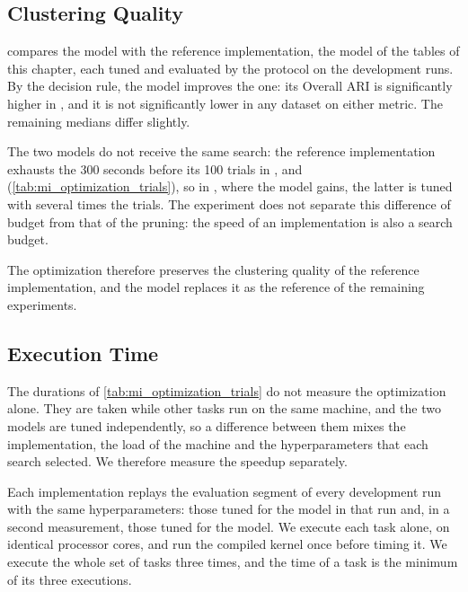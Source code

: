 \subsection{Clustering Quality}
\label{subsec:mi_optimization_quality}



 compares the  model with the reference implementation, the  model of the tables of this chapter, each tuned and evaluated by the protocol on the development runs. By the decision rule, the  model improves the  one: its Overall ARI is significantly higher in \ChameleonDSThree, and it is not significantly lower in any dataset on either metric. The remaining medians differ slightly.



The two models do not receive the same search: the reference implementation exhausts the 300 seconds before its 100 trials in \RandomRBFGeneratorEvents, \ChameleonDSThree and \ChameleonDSFour (\cref{tab:mi_optimization_trials}), so in \ChameleonDSThree, where the  model gains, the latter is tuned with several times the trials. The experiment does not separate this difference of budget from that of the pruning: the speed of an implementation is also a search budget.

The optimization therefore preserves the clustering quality of the reference implementation, and the  model replaces it as the reference of the remaining experiments.

\subsection{Execution Time}
\label{subsec:mi_optimization_time}

The durations of \cref{tab:mi_optimization_trials} do not measure the optimization alone. They are taken while other tasks run on the same machine, and the two models are tuned independently, so a difference between them mixes the implementation, the load of the machine and the hyperparameters that each search selected. We therefore measure the speedup separately.

Each implementation replays the evaluation segment of every development run with the same hyperparameters: those tuned for the  model in that run and, in a second measurement, those tuned for the  model. We execute each task alone, on identical processor cores, and run the compiled kernel once before timing it. We execute the whole set of tasks three times, and the time of a task is the minimum of its three executions.

